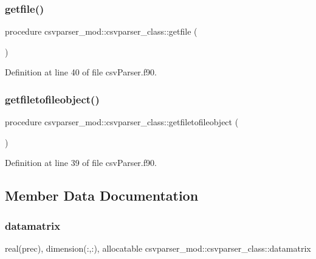 \subsubsection{\texorpdfstring{getfile()}{getfile()}}
{\footnotesize\ttfamily procedure csvparser\+\_\+mod\+::csvparser\+\_\+class\+::getfile (\begin{DoxyParamCaption}{ }\end{DoxyParamCaption})\hspace{0.3cm}{\ttfamily [private]}}



Definition at line 40 of file csv\+Parser.\+f90.

\mbox{\label{structcsvparser__mod_1_1csvparser__class_a9b0867325f70b9683aa558da0e5c6ddd}} 
\subsubsection{\texorpdfstring{getfiletofileobject()}{getfiletofileobject()}}
{\footnotesize\ttfamily procedure csvparser\+\_\+mod\+::csvparser\+\_\+class\+::getfiletofileobject (\begin{DoxyParamCaption}{ }\end{DoxyParamCaption})\hspace{0.3cm}{\ttfamily [private]}}



Definition at line 39 of file csv\+Parser.\+f90.



\subsection{Member Data Documentation}
\mbox{\label{structcsvparser__mod_1_1csvparser__class_afb06725049484011f39d9183adc9d192}} 
\subsubsection{\texorpdfstring{datamatrix}{datamatrix}}
{\footnotesize\ttfamily real(prec), dimension(\+:,\+:), allocatable csvparser\+\_\+mod\+::csvparser\+\_\+class\+::datamatrix\hspace{0.3cm}{\ttfamily [private]}}



